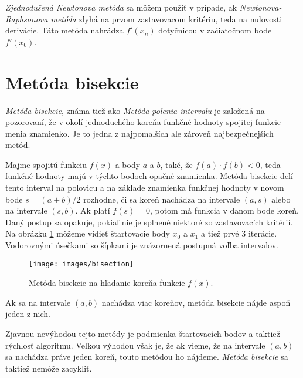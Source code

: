 \textit{Zjednodušená Newtonova metóda} sa môžem použiť v prípade, ak \textit{Newtonova-Raphsonova metóda} zlyhá na prvom 
zastavovacom kritériu, teda na nulovosti derivácie. Táto metóda nahrádza $f'(x_n)$ dotyčnicou v začiatočnom bode $f'(x_0)$.  
\fi

\section{Metóda bisekcie}

\textit{Metóda bisekcie}, známa tiež ako \textit{Metóda polenia intervalu} je založená 
na pozorovaní, že v okolí jednoduchého koreňa funkčné hodnoty spojitej funkcie menia znamienko. 
Je to jedna z najpomalších ale zároveň najbezpečnejších metód.

Majme spojitú funkciu $f(x)$ a body $a$ a $b$, také, že $f(a) \cdot f(b) < 0$, teda 
funkčné hodnoty majú v týchto bodoch opačné znamienka. Metóda bisekcie delí tento 
interval na polovicu a na základe znamienka funkčnej hodnoty v novom bode $s = (a+b)/2$
rozhodne, či sa koreň nachádza na intervale $(a, s)$ alebo na intervale $(s, b)$. 
Ak platí $f(s) = 0$, potom má funkcia v danom bode koreň. Daný postup sa opakuje, 
pokiaľ nie je splnené niektoré zo zastavovacích kritérií. Na obrázku \ref{obr:bisection}
môžeme vidieť štartovacie body $x_0$ a $x_1$ a tiež prvé 3 iterácie. Vodorovnými
úsečkami so šípkami je znázornená postupná voľba intervalov. 

\begin{figure}
    \centerline{\texttt{[image: images/bisection]}}
    \caption[Metóda bisekcie]{Metóda bisekcie na hľadanie koreňa funkcie $f(x)$.}
    \label{obr:bisection}
\end{figure}

Ak sa na intervale $(a, b)$ nachádza viac koreňov, metóda bisekcie nájde aspoň jeden z nich.

Zjavnou nevýhodou tejto metódy je podmienka štartovacích bodov a taktiež rýchlosť algoritmu. 
Veľkou výhodou však je, že ak vieme, že na intervale $(a, b)$ sa nachádza práve jeden koreň, 
touto metódou ho nájdeme. \textit{Metóda bisekcie} sa taktiež nemôže zacykliť.

